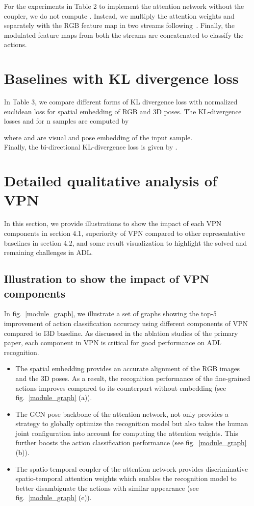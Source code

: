 \documentclass[runningheads]{llncs}
\begin{document}
For the experiments in Table 2 to implement the attention network without the coupler, we do not compute  . Instead, we multiply the attention weights  and  separately with the RGB feature map  in two streams following~\cite{STA_iccv}. Finally, the modulated feature maps from both the streams are concatenated to classify the actions. 

\section{Baselines with KL divergence loss}
In Table 3, we compare different forms of KL divergence loss with normalized euclidean loss for spatial embedding of RGB and 3D poses.
The KL-divergence losses  and  for n samples are computed by

where  and  are visual and pose embedding of the  input sample.\\
Finally, the bi-directional KL-divergence loss is given by .

\section{Detailed qualitative analysis of VPN}
In this section, we provide illustrations to show the impact of each VPN components in section 4.1, superiority of VPN compared to other representative baselines in section 4.2, and some result visualization to highlight the solved and remaining challenges in ADL.
\subsection{Illustration to show the impact of VPN components}
In fig.~\ref{module_graph}, we illustrate a set of graphs showing the top-5 improvement of action classification accuracy using different components of VPN compared to I3D baseline. As discussed in the ablation studies of the primary paper, each component in VPN is critical for good performance on ADL recognition.
\begin{itemize}
    \item The spatial embedding provides an accurate alignment of the RGB images and the 3D poses. As a result, the recognition performance of the fine-grained actions improves compared to its counterpart without embedding (see fig.~\ref{module_graph} (a)).
    \item The GCN pose backbone of the attention network, not only provides a strategy to globally optimize the recognition model but also takes the human joint configuration into account for computing the attention weights. This further boosts the action classification performance (see fig.~\ref{module_graph} (b)).
    \item The spatio-temporal coupler of the attention network provides discriminative spatio-temporal attention weights which enables the recognition model to better disambiguate the actions with similar appearance (see fig.~\ref{module_graph} (c)).
\end{itemize}
\end{document}
